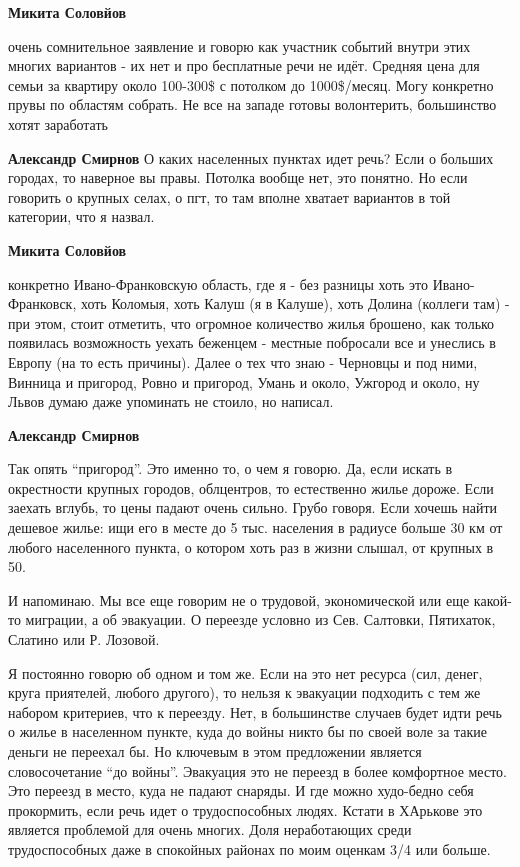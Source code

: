 \begin{itemize}
\begin{itemize}
\textbf{Микита Соловйов} 

очень сомнительное заявление и говорю как участник событий внутри этих многих
вариантов - их нет и про бесплатные речи не идёт. Средняя цена для семьи за
квартиру около 100-300\$ с потолком до 1000\$/месяц. Могу конкретно прувы по
областям собрать. Не все на западе готовы волонтерить, большинство хотят
заработать

\textbf{Александр Смирнов} О каких населенных пунктах идет речь? Если о больших городах, то наверное вы правы. Потолка вообще нет, это понятно. Но если говорить о крупных селах, о пгт, то там вполне хватает вариантов в той категории, что я назвал.

\textbf{Микита Соловйов} 

конкретно Ивано-Франковскую область, где я - без разницы хоть это
Ивано-Франковск, хоть Коломыя, хоть Калуш (я в Калуше), хоть Долина (коллеги
там) - при этом, стоит отметить, что огромное количество жилья брошено, как
только появилась возможность уехать беженцем - местные побросали все и унеслись
в Европу (на то есть причины). Далее о тех что знаю - Черновцы и под ними,
Винница и пригород, Ровно и пригород, Умань и около, Ужгород и около, ну Львов
думаю даже упоминать не стоило, но написал.

\textbf{Александр Смирнов} 

Так опять \enquote{пригород}. Это именно то, о чем я говорю. Да, если искать в
окрестности крупных городов, облцентров, то естественно жилье дороже. Если
заехать вглубь, то цены падают очень сильно. Грубо говоря. Если хочешь найти
дешевое жилье: ищи его в месте до 5 тыс. населения в радиусе больше 30 км от
любого населенного пункта, о котором хоть раз в жизни слышал, от крупных в 50.

И напоминаю. Мы все еще говорим не о трудовой, экономической или еще какой-то
миграции, а об эвакуации. О переезде условно из Сев. Салтовки, Пятихаток,
Слатино или Р. Лозовой.


Я постоянно говорю об одном и том же. Если на это нет ресурса (сил, денег,
круга приятелей, любого другого), то нельзя к эвакуации подходить с тем же
набором критериев, что к переезду. Нет, в большинстве случаев будет идти речь о
жилье в населенном пункте, куда до войны никто бы по своей воле за такие деньги
не переехал бы. Но ключевым в этом предложении является словосочетание \enquote{до
войны}. Эвакуация это не переезд в более комфортное место. Это переезд в место,
куда не падают снаряды. И где можно худо-бедно себя прокормить, если речь идет
о трудоспособных людях. Кстати в ХАрькове это является проблемой для очень
многих. Доля неработающих среди трудоспособных даже в спокойных районах по моим
оценкам 3/4 или больше.


\end{itemize}
\end{itemize}
